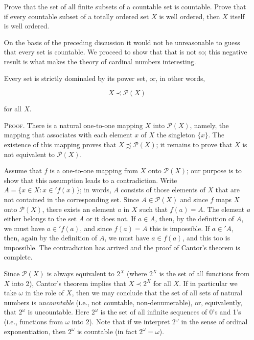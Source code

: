 \begin{exercise} Prove that the set of all finite subsets of a countable set is countable. Prove that if every countable subset of a totally ordered set $X$ is well ordered, then $X$ itself is well ordered. 
\end{exercise}

On the basis of the preceding discussion it would not be unreasonable to guess that every set is countable. We proceed to show that that is not so; this negative result is what makes the theory of cardinal numbers interesting.

\begin{named} Every set is strictly dominaled by its power set, or, in other words, 

\begin{equation*}
X \prec \mathcal{P}(X)
\end{equation*}

for all $X$. 
\end{named}

\textsc{Proof}. There is a natural one-to-one mapping $X$ into $\mathcal{P}(X)$, namely, the mapping that associates with each element $x$ of $X$ the singleton $\{ x \}$. The existence of this mapping proves that $X \precsim \mathcal{P}(X)$; it remains to prove that $X$ is not equivalent to $\mathcal{P}(X)$. 

Assume that $f$ is a one-to-one mapping from $X$ onto $\mathcal{P}(X)$; our purpose is to show that this assumption  leads to a contradiction. Write $A = \{ x \in X: x \in ' f(x) \}$; in words, $A$ consists of those elements of $X$ that are not contained in the corresponding set. Since $A \in \mathcal{P}(X)$ and since $f$ maps $X$ onto $\mathcal{P}(X)$, there exists an element $a$ in $X$ such that $f(a) = A$. The element $a$ either belongs to the set $A$ or it does not. If $a \in A$, then, by the definition of $A$, we must have $a \in ' f(a)$, and since $f(a) = A$ this is impossible. If $a \in ' A$, then, again by the definition of $A$, we must have $a \in f(a)$, and this too is impossible. The contradiction has arrived and the proof of Cantor's theorem is complete.

Since $\mathcal{P}(X)$ is always equivalent to $2^{X}$ (where $2^{X}$ is the set of all functions from $X$ into 2), Cantor's theorem implies that $X \prec 2^{X}$ for all $X$. If in particular we take $\omega$ in the role of $X$, then we may conclude that the set of all sets of natural numbers is \textit{uncountable} (i.e., not countable, non-denumerable), or, equivalently, that $2^{\omega}$ is uncountable. Here $2^{\omega}$ is the set of all infinite sequences of 0's and 1's (i.e., functions from $\omega$ into 2). Note that if we interpret $2^{\omega}$ in the sense of ordinal exponentiation, then $2^{\omega}$ is countable (in fact $2^{\omega} = \omega$).